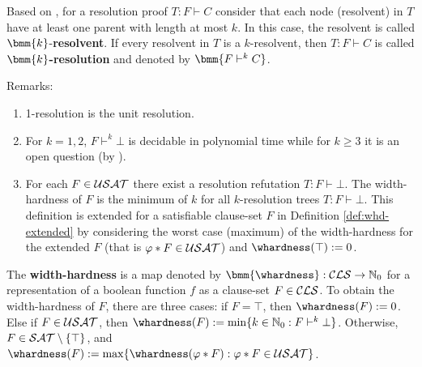 \documentclass{report}
\begin{document}
\begin{defi}\label{def:kres}
Based on \cite{Kl93}, for a resolution proof $T: F \vdash C$ consider that each node (resolvent) in $T$ have at least one parent with length at most $k$. In this case, the resolvent is called $\bmm{k}$-\textbf{resolvent}. If every resolvent in $T$ is a $k$-resolvent, then $T:F \vdash C$ is called $\bmm{k}$\textbf{-resolution} and denoted by $\bmm{F \vdash^k C}$.
\end{defi}
Remarks:
  \begin{enumerate}
  \item 1-resolution is the unit resolution.
  \item For $k=1,2$, $F \vdash^k \bot$ is decidable in polynomial time while for $k \ge 3$ it is an open question (by \cite{BeyersdorffKullmann2014PHP}).
  \item For each $F \in \mathcal{USAT}$ there exist a resolution refutation $T:F \vdash \bot$. The width-hardness of $F$ is the minimum of $k$ for all $k$-resolution trees $T:F \vdash \bot$. This definition is extended for a satisfiable clause-set $F$ in Definition \ref{def:whd-extended} by considering the worst case (maximum) of the width-hardness for the extended $F$ (that is $ \varphi * F \in \mathcal{USAT}$) and $\whardness(\top):=0$.
  \end{enumerate}
 
\begin{defi}\label{def:whd-extended}
The \textbf{width-hardness} is a map denoted by $\bmm{\whardness} : \Cls \rightarrow \NNZ$ for a representation of a boolean function $f$ as a clause-set $F \in \mathcal{CLS}$. To obtain the width-hardness of  $F$, there are three cases: if $F = \top$, then $\whardness(F) := 0$. Else if $F \in \mathcal{USAT}$, then $\whardness(F) := \min \set{k \in \NNZ : F \vdash^k \bot}$. Otherwise, $F \in \mathcal{SAT} \setminus \{ \top \}$, and $\whardness(F) := \max \set{ \whardness(\vp * F) : \vp * F \in \Usat }$.
\end{defi}
\end{document}
